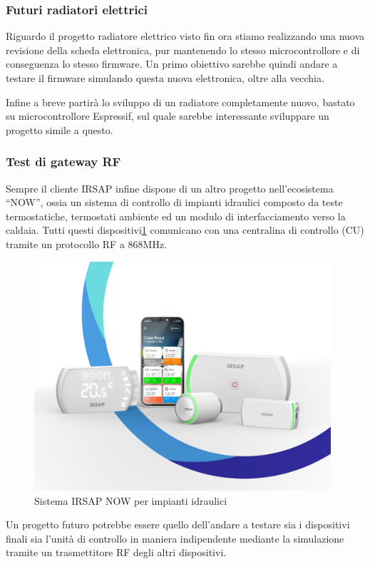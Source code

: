 \documentclass[a4paper,titlepage]{article}
\begin{document}
\subsubsection{Futuri radiatori elettrici}
Riguardo il progetto radiatore elettrico visto fin ora stiamo realizzando una nuova
revisione della scheda elettronica, pur mantenendo lo stesso microcontrollore e
di conseguenza lo stesso firmware. Un primo obiettivo sarebbe quindi andare a testare
il firmware simulando questa nuova elettronica, oltre alla vecchia.

Infine a breve partirà lo sviluppo di un radiatore completamente nuovo, bastato su
microcontrollore Espressif, sul quale sarebbe interessante sviluppare un progetto
simile a questo.

\subsubsection{Test di gateway RF}

Sempre il cliente IRSAP infine dispone di un altro progetto nell'ecosistema ``NOW'',
ossia un sistema di controllo di impianti idraulici composto da teste termostatiche,
termostati ambiente ed un modulo di interfacciamento verso la caldaia. Tutti questi
dispositivi\ref{dispositivi_now} comunicano con una centralina di controllo (CU) tramite un protocollo RF
a 868MHz.

\begin{figure}[h]
    \centering
    \includegraphics[width=11cm]{img/now.jpeg}
    \caption{Sistema IRSAP NOW per impianti idraulici}
    \label{dispositivi_now}
\end{figure}

Un progetto futuro potrebbe essere quello dell'andare a testare sia i dispositivi finali
sia l'unità di controllo in maniera indipendente mediante la simulazione tramite
un trasmettitore RF degli altri dispositivi.
\end{document}
